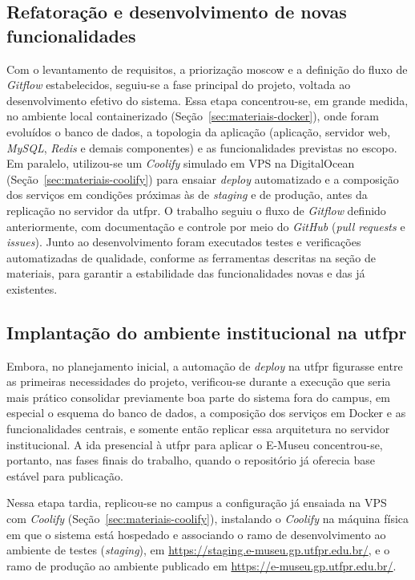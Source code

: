 \subsection{Refatoração e desenvolvimento de novas funcionalidades}

Com o levantamento de requisitos, a priorização \acrshort{moscow} e a definição do fluxo de \textit{Gitflow} estabelecidos, seguiu-se a fase principal do projeto, voltada ao desenvolvimento efetivo do sistema. Essa etapa concentrou-se, em grande medida, no ambiente local containerizado (Seção~\ref{sec:materiais-docker}), onde foram evoluídos o banco de dados, a topologia da aplicação (aplicação, servidor web, \textit{MySQL}, \textit{Redis} e demais componentes) e as funcionalidades previstas no escopo. Em paralelo, utilizou-se um \textit{Coolify} simulado em VPS na DigitalOcean (Seção~\ref{sec:materiais-coolify}) para ensaiar \textit{deploy} automatizado e a composição dos serviços em condições próximas às de \textit{staging} e de produção, antes da replicação no servidor da \acrshort{utfpr}. O trabalho seguiu o fluxo de \textit{Gitflow} definido anteriormente, com documentação e controle por meio do \textit{GitHub} (\textit{pull requests} e \textit{issues}). Junto ao desenvolvimento foram executados testes e verificações automatizadas de qualidade, conforme as ferramentas descritas na seção de materiais, para garantir a estabilidade das funcionalidades novas e das já existentes.


\subsection{Implantação do ambiente institucional na \acrshort{utfpr}}\label{sec:metodos-utfpr-deploy}

Embora, no planejamento inicial, a automação de \textit{deploy} na \acrshort{utfpr} figurasse entre as primeiras necessidades do projeto, verificou-se durante a execução que seria mais prático consolidar previamente boa parte do sistema fora do campus, em especial o esquema do banco de dados, a composição dos serviços em Docker e as funcionalidades centrais, e somente então replicar essa arquitetura no servidor institucional. A ida presencial à \acrshort{utfpr} para aplicar o E-Museu concentrou-se, portanto, nas fases finais do trabalho, quando o repositório já oferecia base estável para publicação.

Nessa etapa tardia, replicou-se no campus a configuração já ensaiada na VPS com \textit{Coolify} (Seção~\ref{sec:materiais-coolify}), instalando o \textit{Coolify} na máquina física em que o sistema está hospedado e associando o ramo de desenvolvimento ao ambiente de testes (\textit{staging}), em \url{https://staging.e-museu.gp.utfpr.edu.br/}, e o ramo de produção ao ambiente publicado em \url{https://e-museu.gp.utfpr.edu.br/}.

